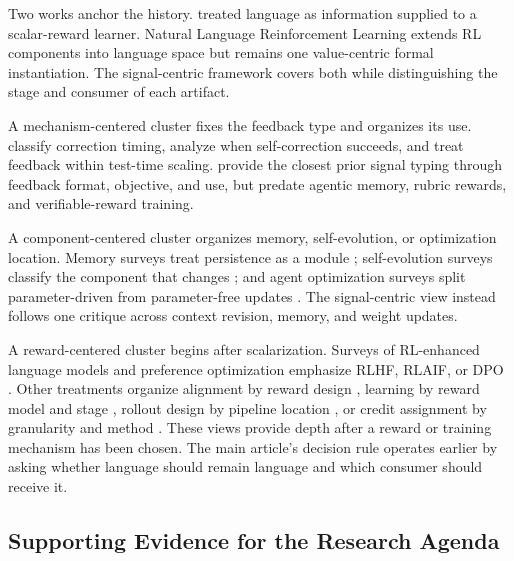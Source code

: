 Two works anchor the history. \citet{luketina2019survey} treated language as information supplied to a scalar-reward learner. Natural Language Reinforcement Learning \citep{feng2024natural} extends RL components into language space but remains one value-centric formal instantiation. The signal-centric framework covers both while distinguishing the stage and consumer of each artifact.

A mechanism-centered cluster fixes the feedback type and organizes its use. \citet{pan2023automatically} classify correction timing, \citet{kamoi2024can} analyze when self-correction succeeds, and \citet{zhang2025testtime} treat feedback within test-time scaling. \citet{fernandes2023bridging} provide the closest prior signal typing through feedback format, objective, and use, but predate agentic memory, rubric rewards, and verifiable-reward training.

A component-centered cluster organizes memory, self-evolution, or optimization location. Memory surveys treat persistence as a module \citep{zhang2025survey}; self-evolution surveys classify the component that changes \citep{gao2025survey,fang2025comprehensive}; and agent optimization surveys split parameter-driven from parameter-free updates \citep{du2025survey}. The signal-centric view instead follows one critique across context revision, memory, and weight updates.

A reward-centered cluster begins after scalarization. Surveys of RL-enhanced language models and preference optimization emphasize RLHF, RLAIF, or DPO \citep{wang2024reinforcement,xiao2024comprehensive}. Other treatments organize alignment by reward design \citep{ji2025survey}, learning by reward model and stage \citep{wu2025sailing}, rollout design by pipeline location \citep{surana2026generate}, or credit assignment by granularity and method \citep{zhang2026reasoning}. These views provide depth after a reward or training mechanism has been chosen. The main article's decision rule operates earlier by asking whether language should remain language and which consumer should receive it.

\subsection{Supporting Evidence for the Research Agenda}
\label{supp:subsec:agenda-evidence}

